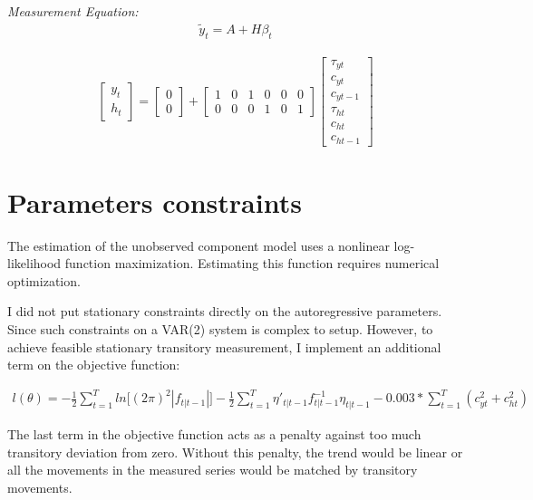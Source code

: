 \documentclass[fleqn]{article}
\begin{document}
\begin{outline}[enumerate]
		\textit{Measurement Equation:}
		\begin{align}
		\tilde{y}_t = A + H\beta_t
		\end{align}
		
		\begin{align*}
		\begin{bmatrix}
		y_t	\\
		h_t
		\end{bmatrix}
		=
		\begin{bmatrix}
		0	\\
		0
		\end{bmatrix}
		+
		\begin{bmatrix}
		1	& 0	& 1	& 0	& 0 & 0 \\
		0	& 0 & 0 & 1 & 0 & 1
		\end{bmatrix}
		\begin{bmatrix}
		\tau_{yt}	\\
		c_{yt}		\\
		c_{yt-1}	\\
		\tau_{ht}	\\
		c_{ht}		\\
		c_{ht-1}
		\end{bmatrix}
		\end{align*}
		\pagebreak
\section{Parameters constraints}

The estimation of the unobserved component model uses a nonlinear log-likelihood function maximization. Estimating this function requires numerical optimization.


I did not put stationary constraints directly on the autoregressive parameters. Since such constraints on a VAR(2) system is complex to setup. However, to achieve feasible stationary transitory measurement, I implement an additional term on the objective function:

\begin{align}
l(\theta) = -\frac{1}{2}\sum_{t=1}^{T}ln\lbrack(2\pi)^2|f_{t|t-1}|\rbrack
-\frac{1}{2}\sum_{t=1}^{T}\eta'_{t|t-1}f^{-1}_{t|t-1}\eta_{t|t-1}
- 0.003*\sum_{t=1}^{T}(c_{yt}^2+c_{ht}^2)
\end{align}

The last term in the objective function acts as a penalty against too much transitory deviation from zero. Without this penalty, the trend would be linear or all the movements in the measured series would be matched by transitory movements.


\end{outline}
\end{document}

